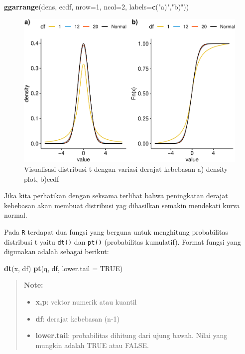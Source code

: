 \documentclass[]{book}
\newenvironment{Shaded}{\begin{snugshade}}{\end{snugshade}}
\newcommand{\KeywordTok}[1]{\textcolor[rgb]{0.13,0.29,0.53}{\textbf{#1}}}
\newcommand{\DataTypeTok}[1]{\textcolor[rgb]{0.13,0.29,0.53}{#1}}
\newcommand{\DecValTok}[1]{\textcolor[rgb]{0.00,0.00,0.81}{#1}}
\newcommand{\StringTok}[1]{\textcolor[rgb]{0.31,0.60,0.02}{#1}}
\newcommand{\OtherTok}[1]{\textcolor[rgb]{0.56,0.35,0.01}{#1}}
\newcommand{\NormalTok}[1]{#1}
\providecommand{\tightlist}{%
  \setlength{\itemsep}{0pt}\setlength{\parskip}{0pt}}
\begin{document}
\begin{Shaded}
\begin{Highlighting}[]
\KeywordTok{ggarrange}\NormalTok{(dens, ecdf, }\DataTypeTok{nrow=}\DecValTok{1}\NormalTok{, }\DataTypeTok{ncol=}\DecValTok{2}\NormalTok{, }\DataTypeTok{labels=}\KeywordTok{c}\NormalTok{(}\StringTok{"a)"}\NormalTok{,}\StringTok{"b)"}\NormalTok{))}
\end{Highlighting}
\end{Shaded}

\begin{figure}

{\centering \includegraphics[width=0.9\linewidth]{EnvStat_files/figure-latex/dtvis-1} 

}

\caption{Visualisasi distribusi t dengan variasi derajat kebebasan a) density plot, b)ecdf}\label{fig:dtvis}
\end{figure}

Jika kita perhatikan dengan seksama terlihat bahwa peningkatan derajat
kebebasan akan membuat distribusi yag dihasilkan semakin mendekati kurva
normal.

Pada \texttt{R} terdapat dua fungsi yang berguna untuk menghitung
probabilitas distribusi t yaitu \texttt{dt()} dan \texttt{pt()}
(probabilitas kumulatif). Format fungsi yang digunakan adalah sebagai
berikut:

\begin{Shaded}
\begin{Highlighting}[]
\KeywordTok{dt}\NormalTok{(x, df)}
\KeywordTok{pt}\NormalTok{(q, df, }\DataTypeTok{lower.tail =} \OtherTok{TRUE}\NormalTok{)}
\end{Highlighting}
\end{Shaded}

\begin{quote}
\textbf{Note: }

\begin{itemize}
\tightlist
\item
  \textbf{x,p}: vektor numerik atau kuantil
\item
  \textbf{df}: derajat kebebasan (n-1)
\item
  \textbf{lower.tail}: probabilitas dihitung dari ujung bawah. Nilai
  yang mungkin adalah TRUE atau FALSE.
\end{itemize}
\end{quote}
\end{document}
